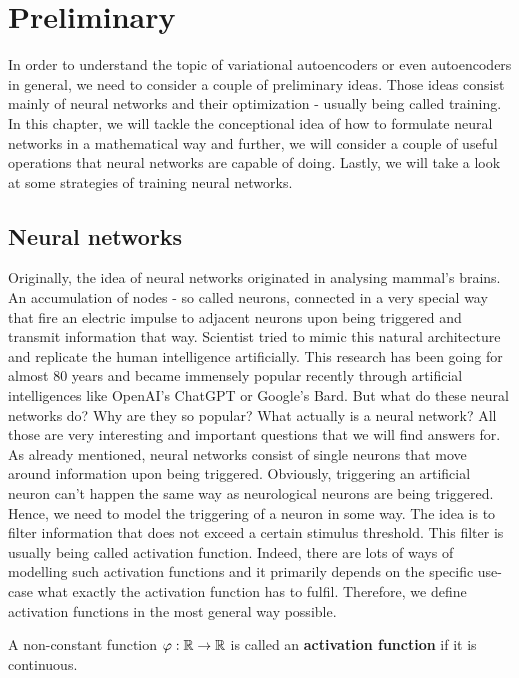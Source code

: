 \chapter{Preliminary}\label{preliminary}
In order to understand the topic of variational autoencoders or even autoencoders in general, we need to consider a couple of preliminary ideas. Those ideas consist mainly of neural networks and their optimization - usually being called training. In this chapter, we will tackle the conceptional idea of how to formulate neural networks in a mathematical way and further, we will consider a couple of useful operations that neural networks are capable of doing. Lastly, we will take a look at some strategies of training neural networks.

\section{Neural networks}
Originally, the idea of neural networks originated in analysing mammal's brains. An accumulation of nodes - so called neurons, connected in a very special way that fire an electric impulse to adjacent neurons upon being triggered and transmit information that way. Scientist tried to mimic this natural architecture and replicate the human intelligence artificially. This research has been going for almost 80 years and became immensely popular recently through artificial intelligences like OpenAI's ChatGPT or Google's Bard. But what do these neural networks do? Why are they so popular? What actually is a neural network? All those are very interesting and important questions that we will find answers for.\\
As already mentioned, neural networks consist of single neurons that move around information upon being \glqq triggered\grqq{}. Obviously, triggering an artificial neuron can't happen the same way as neurological neurons are being triggered. Hence, we need to model the triggering of a neuron in some way. The idea is to filter information that does not exceed a certain stimulus threshold. This filter is usually being called activation function. Indeed, there are lots of ways of modelling such activation functions and it primarily depends on the specific use-case what exactly the activation function has to fulfil. Therefore, we define activation functions in the most general way possible.

\begin{definition}
A non-constant function $\operatorname{\varphi}: \operatorname{\mathbb{R}} \to \operatorname{\mathbb{R}}$ is called an \textbf{activation function} if it is continuous.
\end{definition}

